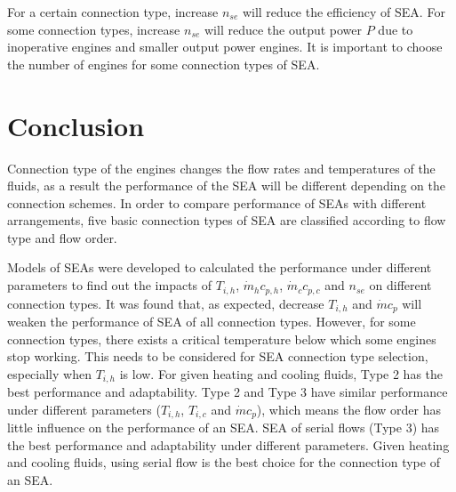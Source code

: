 For a certain connection type, increase $n_{se}$ will reduce the efficiency of SEA. For some connection types, increase $n_{se}$ will reduce the output power $P$ due to inoperative engines and smaller output power engines. It is important to choose the number of engines for some connection types of SEA. 

\section{Conclusion}

Connection type of the engines changes the flow rates and temperatures of the fluids, as a result the performance of the SEA will be different depending on the connection schemes. In order to compare performance of SEAs with different arrangements, five basic connection types of SEA are classified according to flow type and flow order. 


Models of SEAs were developed to calculated the performance under different parameters to find out the impacts of $T_{i,h}$, $\dot{m}_hc_{p,h}$, $\dot{m}_cc_{p,c}$ and $n_{se}$ on different connection types. It was found that, as expected, decrease $T_{i,h}$ and $\dot{m}c_{p}$ will weaken the performance of SEA of all connection types. However, for some connection types, there exists a critical temperature below which some engines stop working. This needs to be considered for SEA connection type selection, especially when $T_{i,h}$ is low. For given heating and cooling fluids, Type 2 has the best performance and adaptability. Type 2 and Type 3 have similar performance under different parameters ($T_{i,h}$, $T_{i,c}$ and $\dot{m}c_p$), which means the flow order has little influence on the performance of an SEA. SEA of serial flows (Type 3) has the best performance and adaptability under different parameters. Given heating and cooling fluids, using serial flow is the best choice for the connection type of an SEA. %

